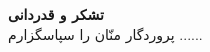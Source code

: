 %
%
%
%
%
%
%
%
%
%
%	

\thispagestyle{empty}
\vspace*{1.5cm}

{\large
	\textbf{تشکر و قدردانی}\\

	
پروردگار منّان را سپاسگزارم ......

}
\restoregeometry
\pagebreak

